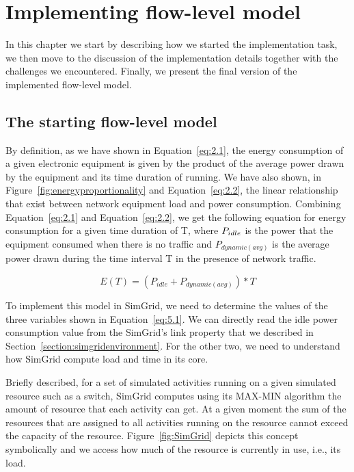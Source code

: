 \chapter{Implementing flow-level model}
\label{chapter:implementation}

In this chapter we start by describing how we started the implementation task, we then move to the discussion of the implementation details together with the challenges we encountered. Finally, we present the final version of the implemented flow-level model. 
\section{The starting flow-level model}
By definition, as we have shown in Equation~\ref{eq:2.1}, the energy consumption of a given electronic equipment is given by the product of the average power drawn by the equipment and its time duration of running. We have also shown, in Figure~\ref{fig:energyproportionality} and Equation~\ref{eq:2.2}, the linear relationship that exist between network equipment load and power consumption. Combining Equation~\ref{eq:2.1} and Equation~\ref{eq:2.2}, we get the following equation for energy consumption for a given time duration of T, where \($$P_{idle}$$\) is the power that the equipment consumed when there is no traffic and \(P_{dynamic (avg)}\) is the average power drawn during the time interval T in the presence of network traffic.

\begin{equation} \label{eq:5.1}
E(T) = (P_{idle} + P_{dynamic (avg)}) * T 
\end{equation} 

To implement this model in SimGrid, we need to determine the values of the three variables shown in Equation~\ref{eq:5.1}. We can directly read the idle power consumption value from the SimGrid's link property that we described in Section~\ref{section:simgridenvironment}. For the other two, we need to understand how SimGrid compute load and time in its core. 

Briefly described, for a set of simulated activities running on a given simulated resource such as a switch, SimGrid computes using its MAX-MIN algorithm the amount of resource that each activity can get. At a given moment the sum of the resources that are assigned to all activities running on the resource cannot exceed the capacity of the resource. Figure~\ref{fig:SimGrid} depicts this concept symbolically and we access how much of the resource is currently in use, i.e., its load. 

